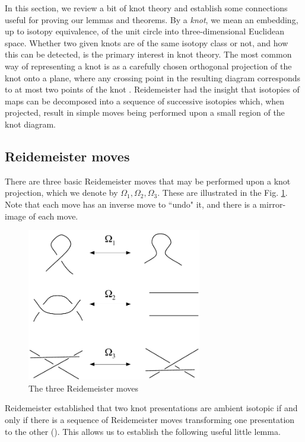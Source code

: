 \documentclass[]{llncs}
\begin{document}
In this section, we review a bit of knot theory and
establish some connections useful for proving our lemmas 
and theorems. By a
\textit{knot}, we mean an embedding, up to isotopy
equivalence, of the unit circle into three-dimensional
Euclidean space. Whether two given knots are of the same
isotopy class or not, and how this can be detected, is the
primary interest in knot theory. The most common way of
representing a knot is as a carefully chosen 
orthogonal projection of the knot onto a plane, where any
crossing point in the resulting diagram corresponds to at
most two points of the knot
\cite{LivingstonText}.  Reidemeister had the insight that
isotopies of maps can be decomposed into a sequence of
successive isotopies which, when projected,  result in
simple moves being performed upon a small region of the
knot diagram.

\subsection{Reidemeister moves}

There are three basic Reidemeister moves that may be
performed upon a knot
projection, which we denote by $\Omega_1, \Omega_2, \Omega_3$. These
are illustrated in the Fig. \ref{RMoves}. Note that each
move has an inverse move to ``undo" it, and there is a
mirror-image of each move.

\begin{figure}
\centering
\includegraphics[width=3in]{Reidemeister123.pdf}
\caption{The three Reidemeister moves}
\label{RMoves}
\end{figure}

Reidemeister established that two knot presentations are
ambient isotopic if
and only if there is a sequence of Reidemeister moves transforming one
presentation to the other (\cite{sossinskyknotsandbraids}). This
allows us to establish the following useful little lemma.
\end{document}
